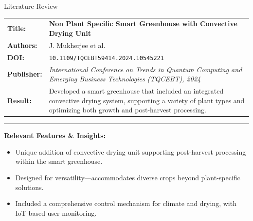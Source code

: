 \documentclass{beamer}
\begin{document}
\begin{frame} {Literature Review}

    \begin{tabularx} {\textwidth} {
            >{\bfseries}m{2.0cm}X
        }

        Title: & \textbf{Non Plant Specific Smart Greenhouse with Convective Drying Unit}
        \\

        Authors: & J. Mukherjee et al.
        \\

        DOI: & \texttt{10.1109/TQCEBT59414.2024.10545221}

        \\

        Publisher: & \textit{International Conference on Trends in Quantum Computing and Emerging Business Technologies (TQCEBT), 2024} \vfill
        \\

        Result: &
        Developed a smart greenhouse that included an integrated convective drying system, supporting a variety
        of plant types and optimizing both growth and post-harvest processing.

        \\

    \end{tabularx}

    {\color{leafColorSecondary} \rule{\textwidth}{0.75pt}}

    \textbf{Relevant Features \& Insights:}

    \begin{itemize}

        \item Unique addition of convective drying unit supporting post-harvest processing within the smart greenhouse.

        \item Designed for versatility—accommodates diverse crops beyond plant-specific solutions.

        \item Included a comprehensive control mechanism for climate and drying, with IoT-based user monitoring.

    \end{itemize}

\end{frame}
\end{document}
